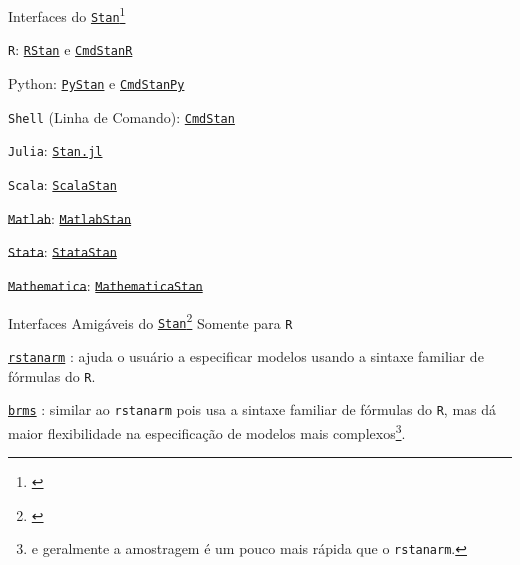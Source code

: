 \begin{frame}{Interfaces do \href{https://mc-stan.org}{\texttt{Stan}}\footnote{\citet*{carpenterStanProbabilisticProgramming2017}}}
    \begin{vfilleditems}
        \item \texttt{R}: \href{https://mc-stan.org/users/interfaces/rstan.html}{\texttt{RStan}} e \href{https://mc-stan.org/cmdstanr}{\texttt{CmdStanR}}
        \item Python: \href{https://mc-stan.org/users/interfaces/pystan.html}{\texttt{PyStan}} e \href{https://cmdstanpy.readthedocs.io/en/latest/getting_started.html}{\texttt{CmdStanPy}}
        \item \texttt{Shell} (Linha de Comando): \href{https://mc-stan.org/users/interfaces/cmdstan.html}{\texttt{CmdStan}}
        \item \texttt{Julia}: \href{https://mc-stan.org/users/interfaces/julia-stan.html}{\texttt{Stan.jl}}
        \item \texttt{Scala}: \href{https://github.com/cibotech/ScalaStan}{\texttt{ScalaStan}}
        \item \sout{\texttt{Matlab}}: \href{https://mc-stan.org/users/interfaces/matlab-stan.html}{\sout{\texttt{MatlabStan}}}
        \item \sout{\texttt{Stata}}: \href{https://mc-stan.org/users/interfaces/stata-stan.html}{\sout{\texttt{StataStan}}}
        \item \sout{\texttt{Mathematica}}: \href{https://mc-stan.org/users/interfaces/mathematica-stan.html}{\sout{\texttt{MathematicaStan}}}
    \end{vfilleditems}
\end{frame}

\begin{frame}{Interfaces Amigáveis do \href{https://mc-stan.org}{\texttt{Stan}}\footnote{\citet*{carpenterStanProbabilisticProgramming2017}}}
Somente para \texttt{R}

    \begin{vfilleditems}
    \item \href{http://mc-stan.org/rstanarm/}{\texttt{rstanarm}} \citep{rstanarm}: ajuda o usuário a especificar modelos usando a sintaxe familiar de fórmulas do \texttt{R}.
    \item \href{https://github.com/paul-buerkner/brms}{\texttt{brms}} \citep{brms}: similar ao \texttt{rstanarm} pois usa a sintaxe familiar de fórmulas do \texttt{R}, mas dá maior flexibilidade na especificação de modelos mais complexos\footnote{e geralmente a amostragem é um pouco mais rápida que o \texttt{rstanarm}.}.
    \end{vfilleditems}
\end{frame}

